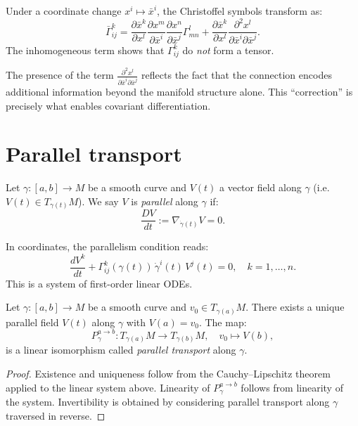 \begin{proposition}
Under a coordinate change $x^i \mapsto \bar{x}^i$, the Christoffel symbols
transform as:
\[
    \bar{\Gamma}^k_{ij} = \frac{\partial \bar{x}^k}{\partial x^l}
    \frac{\partial x^m}{\partial \bar{x}^i} \frac{\partial x^n}{\partial \bar{x}^j}
    \Gamma^l_{mn}
    + \frac{\partial \bar{x}^k}{\partial x^l}
    \frac{\partial^2 x^l}{\partial \bar{x}^i \partial \bar{x}^j}.
\]
The inhomogeneous term shows that $\Gamma^k_{ij}$ do \emph{not} form a tensor.
\end{proposition}

\begin{intuition}[title=\textbf{Christoffel symbols are not tensors}]
The presence of the term $\frac{\partial^2 x^l}{\partial \bar{x}^i \partial \bar{x}^j}$
reflects the fact that the connection encodes additional information beyond the
manifold structure alone. This ``correction'' is precisely what enables covariant
differentiation.
\end{intuition}

\section{Parallel transport}

\begin{definition}
Let $\gamma : [a,b] \to M$ be a smooth curve and $V(t)$ a vector field along
$\gamma$ (i.e.\ $V(t) \in T_{\gamma(t)}M$). We say $V$ is \emph{parallel}
along $\gamma$ if:
\[
    \frac{D V}{dt} := \nabla_{\dot{\gamma}(t)} V = 0.
\]
\end{definition}

In coordinates, the parallelism condition reads:
\[
    \frac{dV^k}{dt} + \Gamma^k_{ij}(\gamma(t))\, \dot{\gamma}^i(t)\, V^j(t) = 0,
    \quad k = 1, \ldots, n.
\]
This is a system of first-order linear ODEs.

\begin{theorem}
Let $\gamma : [a,b] \to M$ be a smooth curve and $v_0 \in T_{\gamma(a)}M$.
There exists a unique parallel field $V(t)$ along $\gamma$ with $V(a) = v_0$.
The map:
\[
    P_\gamma^{a \to b} : T_{\gamma(a)}M \to T_{\gamma(b)}M,
    \quad v_0 \mapsto V(b),
\]
is a linear isomorphism called \emph{parallel transport} along $\gamma$.
\end{theorem}

\begin{proof}
Existence and uniqueness follow from the Cauchy--Lipschitz theorem applied to
the linear system above. Linearity of $P_\gamma^{a \to b}$ follows from
linearity of the system. Invertibility is obtained by considering parallel
transport along $\gamma$ traversed in reverse.
\end{proof}

